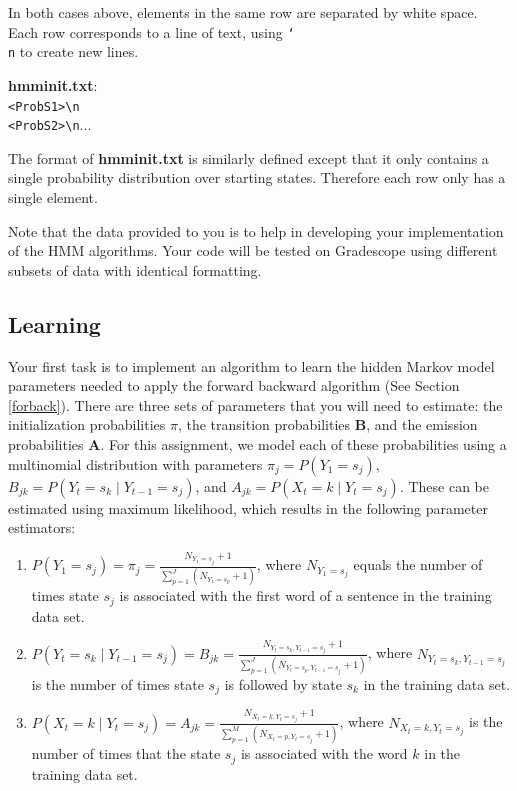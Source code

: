 \documentclass[11pt,addpoints,answers]{exam}
\begin{document}
\begin{enumerate}
In both cases above, elements in the same row are separated by white space. Each row corresponds to a line of text, using \texttt{\char`\\ n} to create new lines.
    
    \textbf{hmminit.txt}:\\
    \texttt{<ProbS1>\textbackslash n}\\
     \texttt{<ProbS2>\textbackslash n}...
     
The format of \textbf{hmminit.txt} is similarly defined except that it only contains a single probability distribution over starting states. Therefore each row only has a single element.

\end{enumerate}

Note that the data provided to you is to help in developing your implementation of the HMM algorithms. Your code will be tested on Gradescope using different subsets of data with identical formatting.

\subsection{Learning}\label{learn}
Your first task is to implement an algorithm to learn the hidden Markov model parameters needed to apply the forward backward algorithm (See Section \ref{forback}). There are three sets of parameters that you will need to estimate: the initialization probabilities {\boldmath$\pi$}, the transition probabilities $\mathbf B$, and the emission probabilities $\mathbf A$. For this assignment, we model each of these probabilities using a multinomial distribution with parameters $ \pi_j=P(Y_1=s_j)$, $ B_{jk} = P(Y_{t}=s_k\mid Y_{t-1}=s_j)$, and $ A_{jk} = P(X_t=k\mid Y_{t}=s_j)$. These can be estimated using maximum likelihood, which results in the following parameter estimators:

\begin{enumerate}
    \item $P(Y_1 = s_j) = \pi_j = \frac{N_{Y_1=s_j}+1}{\sum_{p=1}^{J}(N_{Y_1=s_p}+1)}$, where $N_{Y_1=s_j}$ equals the number of times state $s_j$ is associated with the first word of a sentence in the training data set.
    \item $P(Y_{t} = s_k\mid Y_{t-1}=s_j) = B_{jk}= \frac{N_{Y_t=s_k,Y_{t-1}=s_j}+1}{\sum_{p=1}^J (N_{Y_t=s_p,Y_{t-1}=s_j}+1)}$, where $N_{Y_t=s_k,Y_{t-1}=s_j}$ is the number of times state $s_j$ is followed by state $s_k$ in the training data set.  
    \item $P(X_{t} = k\mid Y_{t}=s_j) = A_{jk}= \frac{N_{X_t=k,Y_t=s_j}+1}{\sum_{p=1}^M (N_{X_t=p,Y_t=s_j}+1)}$, where $N_{X_t=k,Y_t=s_j}$ is the number of times that the state $s_j$ is associated with the word $k$ in the training data set.
\end{enumerate}
\end{document}
